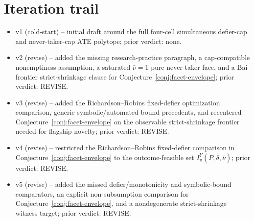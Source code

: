 \documentclass[11pt]{article}
\theoremstyle{definition}
\theoremstyle{plain}
\theoremstyle{remark}
\begin{document}
\section{Iteration trail}
\begin{itemize}[leftmargin=*]
\item v1 (cold-start) -- initial draft around the full four-cell simultaneous
defier-cap and never-taker-cap ATE polytope; prior verdict: none.
\item v2 (revise) -- added the missing research-practice paragraph, a
cap-compatible nonemptiness assumption, a saturated \(\bar\nu=1\) pure
never-taker face, and a Bai-frontier strict-shrinkage clause for
Conjecture~\ref{conj:facet-envelope}; prior verdict: REVISE.
\item v3 (revise) -- added the Richardson--Robins fixed-defier optimization
comparison, generic symbolic/automated-bound precedents, and recentered
Conjecture~\ref{conj:facet-envelope} on the observable strict-shrinkage
frontier needed for flagship novelty; prior verdict: REVISE.
\item v4 (revise) -- restricted the Richardson--Robins fixed-defier comparison
in Conjecture~\ref{conj:facet-envelope} to the outcome-feasible set
\(I_{\pi}^{Y}(P,\bar\delta,\bar\nu)\); prior verdict: REVISE.
\item v5 (revise) -- added the missed defier/monotonicity and symbolic-bound
comparators, an explicit non-subsumption comparison for Conjecture~\ref{conj:facet-envelope},
and a nondegenerate strict-shrinkage witness target; prior verdict: REVISE.
\end{itemize}
\end{document}
